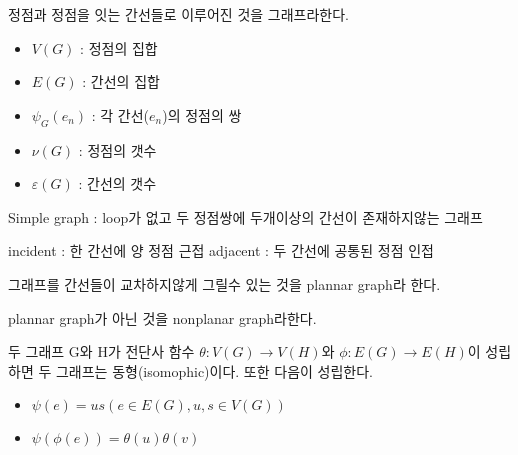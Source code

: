 \documentclass{oblivoir}
\begin{document}
    \begin{dfn}[Graph] 정점과 정점을 잇는 간선들로 이루어진 것을 그래프라한다.
        \begin{itemize}
            \item $V(G)$ :  정점의 집합
            \item $E(G)$ :  간선의 집합
            \item $\psi_G(e_n)$ :  각 간선($e_n$)의 정점의 쌍
            \item $\nu(G)$ :  정점의 갯수 
            \item $\varepsilon(G)$ :  간선의 갯수
        \end{itemize}

        Simple graph : loop가 없고 두 정점쌍에 두개이상의 간선이 존재하지않는 그래프

        incident : 한 간선에 양 정점 근접
        adjacent : 두 간선에 공통된 정점 인접
    \end{dfn}

    \begin{dfn}[planar]

        그래프를 간선들이 교차하지않게 그릴수 있는 것을 plannar graph라 한다. 
        
        plannar graph가 아닌 것을 nonplanar graph라한다.
    \end{dfn}
    \begin{dfn}[isomophic] 두 그래프 G와 H가  전단사 함수 $\theta : V(G) \longrightarrow V(H)$와 $\phi : E(G) \rightarrow E(H)$이 성립하면 두 그래프는 동형(isomophic)이다.
        또한 다음이 성립한다.
    \begin{itemize}
        \item $\psi(e) = us( e \in E(G), u,s \in V(G)) $
        \item $\psi(\phi(e)) = \theta(u)\theta(v)$%
    \end{itemize}
    \end{dfn}
    
\end{document}
